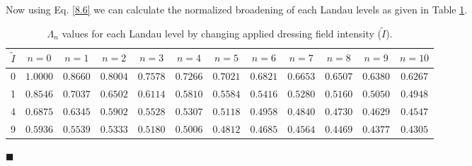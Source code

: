 \noindent
Now using Eq. \eqref{8.6} we can calculate the normalized broadening of each Landau levels as given in Table \ref{tab:8.1}.

\begin{table}[ht!]
\begin{center}
\begin{tabular}{ |c|c|c|c|c|c|c|c|c|c|c|c| }
 \hline
 ${\tilde{I}}$
 & $n=0$ & $n=1$ & $n=2$ & $n=3$ & $n=4$ & $n=5$ & $n=6$ & $n=7$ & $n=8$ & $n=9$
 & $n=10$
 \\ [0.5ex] \hline\hline
 0  & $1.0000$ & $0.8660$ & $0.8004$ & $0.7578$ & $0.7266$
 & $0.7021$ & $0.6821$ & $0.6653$ & $0.6507$ & $0.6380$& $0.6267$ \\ \hline
 1  & $0.8546$ & $0.7037$ & $0.6502$ & $0.6114$ & $0.5810$
 & $0.5584$ & $0.5416$ & $0.5280$ & $0.5160$ & $0.5050$ & $0.4948$ \\ \hline
 4  & $0.6875$ & $0.6345$ & $0.5902$ & $0.5528$ & $0.5307$
 & $0.5118$ & $0.4958$ & $0.4840$ & $0.4730$ & $0.4629$  & $0.4547$ \\ \hline
 9  & $0.5936$ & $0.5539$ & $0.5333$ & $0.5180$ & $0.5006$
 & $0.4812$ & $0.4685$ & $0.4564$ & $0.4469$ & $0.4377$  & $0.4305$ \\ \hline
\end{tabular}
\caption {\label{tab:8.1} $\Lambda_n$ values for each Landau level by changing  applied dressing field intensity ($\tilde{I}$). }
\end{center}
\end{table}













\hfill$\blacksquare$

